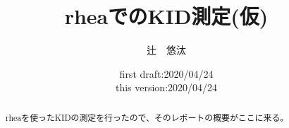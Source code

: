 \documentclass[a4paper,twocolumn, twoside]{bxjsarticle}
\title{\vspace{-4cm}rheaでのKID測定(仮)}
\author{辻　悠汰}
\date{first draft:2020/04/24 \\
      this version:2020/04/24}
\begin{document}
\begin{abstract}
rheaを使ったKIDの測定を行ったので、そのレポートの概要がここに来る。
\end{abstract}

\maketitle






\end{document}

